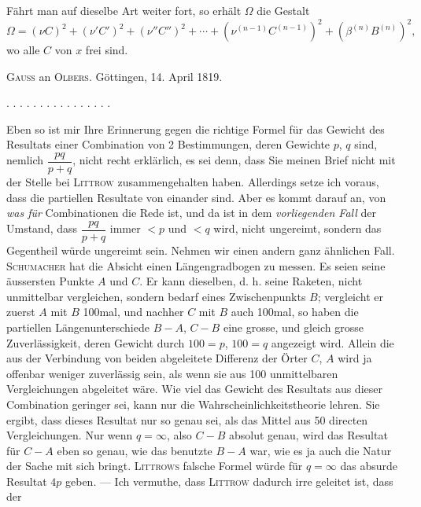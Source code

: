 Fährt man auf dieselbe Art weiter fort, so erhält $\Omega$ die Gestalt
\[
\Omega = (\nu C)^2+(\nu' C')^2+(\nu'' C'')^2+\cdots+(\nu^{(n-1)} C^{(n-1)})^2+(\beta^{(n)} B^{(n)})^2,
\]
wo alle $C$ von $x$ frei sind.



\begin{center}
\textsc{Gauss} an \textsc{Olbers}. Göttingen, 14. April 1819.
\end{center}

\begin{center}
. . . . . . . . . . . . . . . .
\end{center}

Eben so ist mir Ihre Erinnerung gegen die richtige Formel für das Gewicht
des Resultats einer Combination von 2 Bestimmungen, deren Gewichte $p$, $q$
sind, nemlich $\dfrac{pq}{p+q}$, nicht recht erklärlich, es sei denn, dass
Sie meinen Brief nicht mit der Stelle bei \textsc{Littrow} zusammengehalten haben.
Allerdings setze ich voraus, dass die partiellen Resultate von einander
 sind. Aber es kommt darauf an, von \emph{was für} Combinationen
die Rede ist, und da ist in dem \emph{vorliegenden Fall} der Umstand, dass
$\dfrac{pq}{p+q}$ immer $<p$ und $<q$ wird, nicht ungereimt, sondern das
Gegentheil würde ungereimt sein. Nehmen wir einen andern ganz ähnlichen
Fall. \textsc{Schumacher} hat die Absicht einen Längengradbogen zu messen. Es seien
seine äussersten Punkte $A$ und $C$. Er kann dieselben, d. h. seine
Raketen, nicht unmittelbar vergleichen, sondern bedarf eines
Zwischenpunkts $B$; vergleicht er zuerst $A$ mit $B$ 100mal, und nachher
$C$ mit $B$ auch 100mal, so haben die partiellen Längenunterschiede
$B-A$, $C-B$ eine grosse, und gleich grosse Zuverlässigkeit, deren Gewicht
durch $100=p$, $100=q$ angezeigt wird. Allein die aus der Verbindung von
beiden abgeleitete Differenz der Örter $C$, $A$ wird ja offenbar weniger
zuverlässig sein, als wenn sie aus 100 unmittelbaren Vergleichungen
abgeleitet wäre. Wie viel das Gewicht des Resultats aus dieser Combination
geringer sei, kann nur die Wahrscheinlichkeitstheorie lehren. Sie ergibt,
dass dieses  Resultat nur so genau sei, als das Mittel
aus 50 directen Vergleichungen. Nur wenn $q=\infty$, also $C-B$ absolut
genau, wird das  Resultat für $C-A$ eben so genau, wie
das benutzte $B-A$ war, wie es ja auch die Natur der Sache mit sich
bringt. \textsc{Littrows} falsche Formel würde für $q=\infty$ das absurde Resultat
$4p$ geben. --- Ich vermuthe, dass \textsc{Littrow} dadurch irre geleitet ist, dass der
